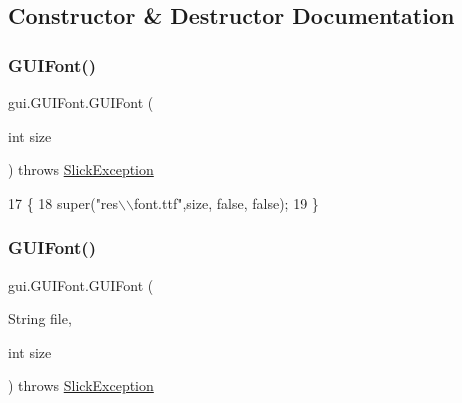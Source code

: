 \subsection{Constructor \& Destructor Documentation}
\mbox{\label{classgui_1_1_g_u_i_font_a5d39053888fa6b4733bc8b8c79a569c9}} 
\subsubsection{\texorpdfstring{G\+U\+I\+Font()}{GUIFont()}\hspace{0.1cm}{\footnotesize\ttfamily [1/2]}}
{\footnotesize\ttfamily gui.\+G\+U\+I\+Font.\+G\+U\+I\+Font (\begin{DoxyParamCaption}\item[{int}]{size }\end{DoxyParamCaption}) throws \mbox{\hyperlink{classorg_1_1newdawn_1_1slick_1_1_slick_exception}{Slick\+Exception}}\hspace{0.3cm}{\ttfamily [inline]}}


\begin{DoxyCode}
17                                                   \{
18         super(\textcolor{stringliteral}{"res\(\backslash\)\(\backslash\)font.ttf"},size, \textcolor{keyword}{false}, \textcolor{keyword}{false});
19     \}
\end{DoxyCode}
\mbox{\label{classgui_1_1_g_u_i_font_afd76649be6fa65d97f57aa6893a39cfa}} 
\subsubsection{\texorpdfstring{G\+U\+I\+Font()}{GUIFont()}\hspace{0.1cm}{\footnotesize\ttfamily [2/2]}}
{\footnotesize\ttfamily gui.\+G\+U\+I\+Font.\+G\+U\+I\+Font (\begin{DoxyParamCaption}\item[{String}]{file,  }\item[{int}]{size }\end{DoxyParamCaption}) throws \mbox{\hyperlink{classorg_1_1newdawn_1_1slick_1_1_slick_exception}{Slick\+Exception}}\hspace{0.3cm}{\ttfamily [inline]}}


